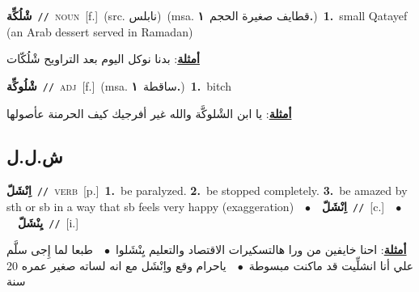 \documentclass[10pt,a4paper,twoside]{article} %
\begin{document}
\begin{multicols}{2}
{\setlength\topsep{0pt}\textbf{\foreignlanguage{arabic}{شْلُكِّة}}\ {\color{gray}\texttt{//}\color{black}}\ \textsc{noun}\ [f.]\ (src. \color{gray}\foreignlanguage{arabic}{نابلس}\color{black})\ \color{gray}(msa. \foreignlanguage{arabic}{قطايف صغيرة الحجم}~\foreignlanguage{arabic}{\textbf{١.}})\color{black}\ \textbf{1.}~small Qatayef  (an Arab dessert served in Ramadan)\  \begin{flushright}\color{gray}\foreignlanguage{arabic}{\textbf{\underline{\foreignlanguage{arabic}{أمثلة}}}: بدنا نوكل اليوم بعد التراويح شْلُكّات}\end{flushright}\color{black}} \vspace{2mm}

{\setlength\topsep{0pt}\textbf{\foreignlanguage{arabic}{شْلُوكِّة}}\ {\color{gray}\texttt{//}\color{black}}\ \textsc{adj}\ [f.]\ \color{gray}(msa. \foreignlanguage{arabic}{ساقطة}~\foreignlanguage{arabic}{\textbf{١.}})\color{black}\ \textbf{1.}~bitch\  \begin{flushright}\color{gray}\foreignlanguage{arabic}{\textbf{\underline{\foreignlanguage{arabic}{أمثلة}}}: يا ابن الشْلوكَّة والله غير أفرجيك كيف الحرمنة عأصولها}\end{flushright}\color{black}} \vspace{2mm}

\vspace{-3mm}
\subsection*{\color{blue}\foreignlanguage{arabic}{ش.ل.ل}\color{blue}{}} 

{\setlength\topsep{0pt}\textbf{\foreignlanguage{arabic}{اِنْشَلّ}}\ {\color{gray}\texttt{//}\color{black}}\ \textsc{verb}\ [p.]\ \textbf{1.}~be paralyzed.  \textbf{2.}~be stopped completely.  \textbf{3.}~be amazed by sth or sb in a way that sb feels very happy (exaggeration)\ \ $\bullet$\ \ \setlength\topsep{0pt}\textbf{\foreignlanguage{arabic}{اِنْشَلّ}}\ {\color{gray}\texttt{//}\color{black}}\ [c.]\ \ $\bullet$\ \ \setlength\topsep{0pt}\textbf{\foreignlanguage{arabic}{يِنْشَلّ}}\ {\color{gray}\texttt{//}\color{black}}\ [i.]\  \begin{flushright}\color{gray}\foreignlanguage{arabic}{\textbf{\underline{\foreignlanguage{arabic}{أمثلة}}}: احنا خايفين من ورا هالتسكيرات الاقتصاد والتعليم يِنْشَلوا\ $\bullet$\ \  طبعا لما إِجى سلَّم علي أنا انشلِّيت قد ماكنت مبسوطة\ $\bullet$\ \  ياحرام وقع واِنْشَل مع انه لساته صغير عمره 20 سنة}\end{flushright}\color{black}} \vspace{2mm}


\end{multicols}
\end{document}
